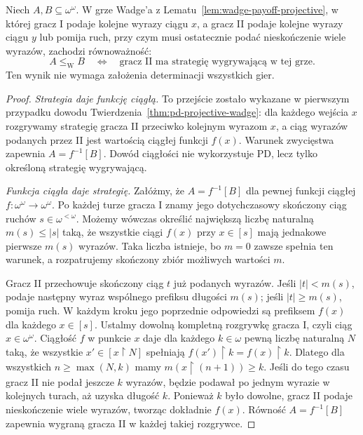 \begin{twierdzenie}
\label{thm:wadge-strategy-continuity}
Niech $A,B\subseteq\omega^\omega$. W grze Wadge'a
z Lematu~\ref{lem:wadge-payoff-projective},
w której gracz I podaje kolejne wyrazy ciągu $x$,
a gracz II podaje kolejne wyrazy ciągu $y$
lub pomija ruch, przy czym musi ostatecznie podać
nieskończenie wiele wyrazów, zachodzi równoważność:
\[
 A\leq_{\mathrm W}B
 \quad\Longleftrightarrow\quad
 \text{gracz II ma strategię wygrywającą w tej grze}.
\]
Ten wynik nie wymaga założenia determinacji
wszystkich gier.
\end{twierdzenie}
\begin{proof}
\emph{Strategia daje funkcję ciągłą.}
To przejście zostało wykazane w pierwszym przypadku
dowodu Twierdzenia~\ref{thm:pd-projective-wadge}:
dla każdego wejścia $x$ rozgrywamy strategię
gracza II przeciwko kolejnym wyrazom $x$,
a ciąg wyrazów podanych przez II jest wartością
ciągłej funkcji $f(x)$. Warunek zwycięstwa
zapewnia $A=f^{-1}[B]$. Dowód ciągłości
nie wykorzystuje PD, lecz tylko określoną
strategię wygrywającą.

\emph{Funkcja ciągła daje strategię.}
Załóżmy, że $A=f^{-1}[B]$ dla pewnej funkcji
ciągłej $f:\omega^\omega\to\omega^\omega$.
Po każdej turze gracza I znamy jego dotychczasowy
skończony ciąg ruchów $s\in\omega^{<\omega}$.
Możemy wówczas określić największą liczbę
naturalną $m(s)\leq|s|$ taką, że wszystkie
ciągi $f(x)$ przy $x\in[s]$ mają jednakowe
pierwsze $m(s)$ wyrazów. Taka liczba istnieje,
bo $m=0$ zawsze spełnia ten warunek, a rozpatrujemy
skończony zbiór możliwych wartości $m$.

Gracz II przechowuje skończony ciąg $t$ już
podanych wyrazów. Jeśli $|t|<m(s)$, podaje
następny wyraz wspólnego prefiksu długości $m(s)$;
jeśli $|t|\ge m(s)$, pomija ruch.
W każdym kroku jego poprzednie odpowiedzi są
prefiksem $f(x)$ dla każdego $x\in[s]$.
Ustalmy dowolną kompletną rozgrywkę gracza I,
czyli ciąg $x\in\omega^\omega$.
Ciągłość $f$ w punkcie $x$ daje dla każdego
$k\in\omega$ pewną liczbę naturalną $N$ taką,
że wszystkie $x'\in[x\upharpoonright N]$
spełniają $f(x')\upharpoonright k=f(x)\upharpoonright k$.
Dlatego dla wszystkich $n\ge\max(N,k)$
mamy $m(x\upharpoonright(n+1))\ge k$.
Jeśli do tego czasu gracz II nie podał jeszcze
$k$ wyrazów, będzie podawał po jednym wyrazie
w kolejnych turach, aż uzyska długość $k$.
Ponieważ $k$ było dowolne, gracz II podaje
nieskończenie wiele wyrazów, tworząc dokładnie
$f(x)$. Równość $A=f^{-1}[B]$ zapewnia
wygraną gracza II w każdej takiej rozgrywce.
\end{proof}

